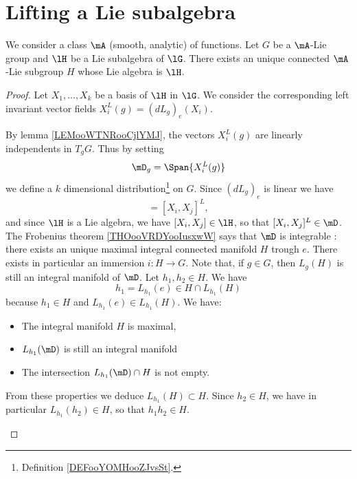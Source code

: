 \section{Lifting a Lie subalgebra}

\begin{theorem}       \label{THOooXALIooGiPVdD}
	We consider a class \( \mA\) (smooth, analytic) of functions. Let \( G\) be a \( \mA\)-Lie group and \( \lH\) be a Lie subalgebra of \( \lG\). There exists an unique connected \( \mA\)-Lie subgroup \( H\) whose Lie algebra is \( \lH\).
\end{theorem}

\begin{proof}
	Let \( X_1,\ldots, X_k\) be a basis of \( \lH\) in \( \lG\). We consider the corresponding left invariant vector fields \( X_i^L(g)=(dL_g)_e(X_i)\).
	\begin{subproof}
		\spitem[A distribution]
		By lemma \ref{LEMooWTNRooCjlYMJ}, the vectors \( X_i^L(g)\) are linearly independents in \( T_gG\). Thus by setting
		\begin{equation}
			\mD_g=\Span\{ X_i^L(g) \}
		\end{equation}
		we define a \( k\) dimensional distribution\footnote{Definition \ref{DEFooYOMHooZJvsSt}.} on \( G\).
		\spitem[Involutive]
		Since \( (dL_g)_e\) is linear we have
		\begin{equation}
			[X_i^L,X_j^L]=[X_i,X_j]^L,
		\end{equation}
		and since \( \lH\) is a Lie algebra, we have \( [X_i,X_j]\in \lH\), so that \( [X_i,X_j]^L\in\mD\).
		\spitem[Frobenius]
		The Frobenius theorem \ref{THOooVRDYooIusxwW} says that \( \mD\) is integrable : there exists an unique maximal integral connected manifold \( H\) trough \( e\). There exists in particular an immersion \( i\colon H\to G\).
		\spitem[\( H\) is a group]
		Note that, if \( g\in G\), then \( L_g(H)\) is still an integral manifold of \( \mD\). Let \( h_1,h_2\in H\). We have
		\begin{equation}
			h_1=L_{h_1}(e)\in H\cap L_{h_1}(H)
		\end{equation}
		because \( h_1\in H\) and \( L_{h_1}(e)\in L_{h_1}(H)\). We have:
		\begin{itemize}
			\item
			      The integral manifold \( H\) is maximal,
			\item
			      \( L_{h_1}(\mD)\) is still an integral manifold
			\item
			      The intersection \( L_{h_1}(\mD)\cap H\) is not empty.
		\end{itemize}
		From these properties we deduce \( L_{h_1}(H)\subset H\). Since \( h_2\in H\), we have in particular \( L_{h_1}(h_2)\in H\), so that \( h_1h_2\in H\).


\end{subproof}
\end{proof}
